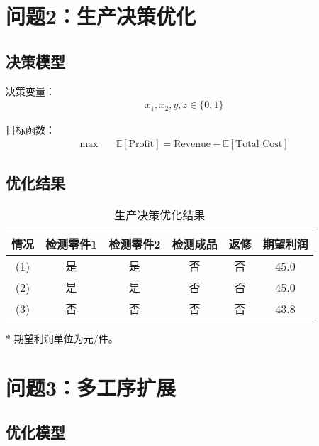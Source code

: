 \documentclass[12pt]{article}
\begin{document}
\section{问题2：生产决策优化}
\subsection{决策模型}

决策变量：
\begin{equation}
\begin{aligned}
x_1, x_2, y, z \in \{0,1\}
\end{aligned}
\end{equation}

目标函数：
\begin{equation}
\begin{aligned}
\max \quad & \mathbb{E}[\text{Profit}] = \text{Revenue} - \mathbb{E}[\text{Total Cost}]
\end{aligned}
\end{equation}

\subsection{优化结果}

\begin{table}[htbp]
\centering
\caption{生产决策优化结果}
\begin{threeparttable}
\begin{tabular}{@{}cccccc@{}}
\toprule
情况 & 检测零件1 & 检测零件2 & 检测成品 & 返修 & 期望利润 \\
\midrule
(1) & 是 & 是 & 否 & 否 & 45.0 \\
(2) & 是 & 是 & 否 & 否 & 45.0 \\
(3) & 否 & 否 & 否 & 否 & 43.8 \\
\bottomrule
\end{tabular}
\begin{tablenotes}
\item[*] 期望利润单位为元/件。
\end{tablenotes}
\end{threeparttable}
\end{table}

\section{问题3：多工序扩展}
\subsection{优化模型}
\end{document}
